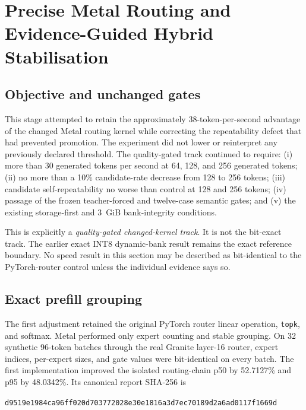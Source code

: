 \section{Precise Metal Routing and Evidence-Guided Hybrid Stabilisation}
\label{sec:precise-metal-hybrid-router}
\providecommand{\aionreporthash}[2]{%
  \par\noindent\texttt{#1}\texttt{#2}\par}

\subsection{Objective and unchanged gates}

This stage attempted to retain the approximately 38-token-per-second advantage
of the changed Metal routing kernel while correcting the repeatability defect
that had prevented promotion.  The experiment did not lower or reinterpret any
previously declared threshold.  The quality-gated track continued to require:
(i) more than 30 generated tokens per second at 64, 128, and 256 generated
tokens; (ii) no more than a 10\% candidate-rate decrease from 128 to 256 tokens;
(iii) candidate self-repeatability no worse than control at 128 and 256 tokens;
(iv) passage of the frozen teacher-forced and twelve-case semantic gates; and
(v) the existing storage-first and 3~GiB bank-integrity conditions.

This is explicitly a \emph{quality-gated changed-kernel track}.  It is not the
bit-exact track.  The earlier exact INT8 dynamic-bank result remains the exact
reference boundary.  No speed result in this section may be described as
bit-identical to the PyTorch-router control unless the individual evidence says
so.

\subsection{Exact prefill grouping}

The first adjustment retained the original PyTorch router linear operation,
\texttt{topk}, and softmax.  Metal performed only expert counting and stable
grouping.  On 32 synthetic 96-token batches through the real Granite layer-16
router, expert indices, per-expert sizes, and gate values were bit-identical on
every batch.  The first implementation improved the isolated routing-chain p50
by 52.7127\% and p95 by 48.0342\%.  Its canonical report SHA-256 is
\aionreporthash{d9519e1984ca96ff020d703772028e30}{e1816a3d7ec70189d2a6ad0117f1669d}

